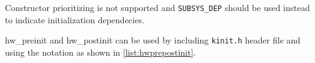 


Constructor prioritizing is not supported and \verb+SUBSYS_DEP+ should be used
instead to indicate initialization dependecies.


hw\_preinit and hw\_postinit can be used by including \verb+kinit.h+ header file
and using the notation as shown in \ref{list:hwprepostinit}.


